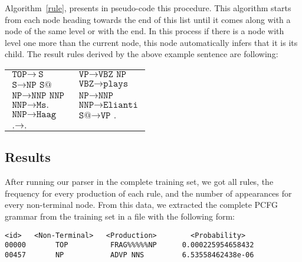 \documentclass[a4paper,11pt]{article}
\begin{document}
Algorithm~\ref{rule}, presents in pseudo-code this procedure. This algorithm starts from each node heading towards the end of this list until it comes along with a node of the same level or with the end. In this process if there is a node with level one more than the current node, this node automatically infers that it is its child. The result rules derived by the above example sentence are following:
\begin{table}[h!]
\begin{scriptsize}
\begin{center}
\begin{tabular}{ l l }
$\texttt{TOP} \rightarrow\ \texttt{S}$ & $\texttt{VP} \rightarrow \texttt{VBZ NP}$ \\
$\texttt{S} \rightarrow \texttt{NP S@}$ & $\texttt{VBZ} \rightarrow \texttt{plays}$ \\
$\texttt{NP} \rightarrow \texttt{NNP NNP}$ & $\texttt{NP} \rightarrow \texttt{NNP}$ \\
$\texttt{NNP} \rightarrow \texttt{Ms.}$ & $\texttt{NNP} \rightarrow \texttt{Elianti}$ \\
$\texttt{NNP} \rightarrow \texttt{Haag}$ & $\texttt{S@} \rightarrow \texttt{VP .}$  \\
$\texttt{.} 	\rightarrow \texttt{.}$ & $ $
\end{tabular}
\end{center}
\end{scriptsize}
\end{table}

\subsection{Results}
After running our parser in the complete training set, we got all rules, the frequency for every production of each rule, and the number of appearances for every non-terminal node. From this data, we extracted the complete PCFG grammar from the training set in a file with the following form:
\begin{verbatim}
<id>   <Non-Terminal>   <Production>        <Probability>
00000       TOP          FRAG%%%%%NP      0.000225954658432 
00457       NP           ADVP NNS         6.53558462438e-06
\end{verbatim}
\end{document}

